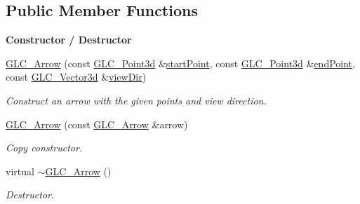 \subsection*{Public Member Functions}
\begin{Indent}{\bf Constructor / Destructor}\par
\begin{DoxyCompactItemize}
\item 
\hyperlink{class_g_l_c___arrow_a625967eed92aa31b012a4112fccb08d7}{G\-L\-C\-\_\-\-Arrow} (const \hyperlink{glc__vector3d_8h_a4e13a9bbc7ab3d34de7e98b41836772c}{G\-L\-C\-\_\-\-Point3d} \&\hyperlink{class_g_l_c___arrow_a6d2bcdd639b9ada7f6c2609ef3c2d6d2}{start\-Point}, const \hyperlink{glc__vector3d_8h_a4e13a9bbc7ab3d34de7e98b41836772c}{G\-L\-C\-\_\-\-Point3d} \&\hyperlink{class_g_l_c___arrow_af850396d971329d424a9ce1c9efe37dd}{end\-Point}, const \hyperlink{class_g_l_c___vector3d}{G\-L\-C\-\_\-\-Vector3d} \&\hyperlink{class_g_l_c___arrow_a2af2b7178bde1936447fc78dbcea3b4f}{view\-Dir})
\begin{DoxyCompactList}\small\item\em Construct an arrow with the given points and view direction. \end{DoxyCompactList}\item 
\hyperlink{class_g_l_c___arrow_a4a78f51eed14836d08253a8b2cf789dc}{G\-L\-C\-\_\-\-Arrow} (const \hyperlink{class_g_l_c___arrow}{G\-L\-C\-\_\-\-Arrow} \&arrow)
\begin{DoxyCompactList}\small\item\em Copy constructor. \end{DoxyCompactList}\item 
virtual \hyperlink{class_g_l_c___arrow_a91a613d4c6327efa08adb6059a081ca5}{$\sim$\-G\-L\-C\-\_\-\-Arrow} ()
\begin{DoxyCompactList}\small\item\em Destructor. \end{DoxyCompactList}\end{DoxyCompactItemize}
\end{Indent}
